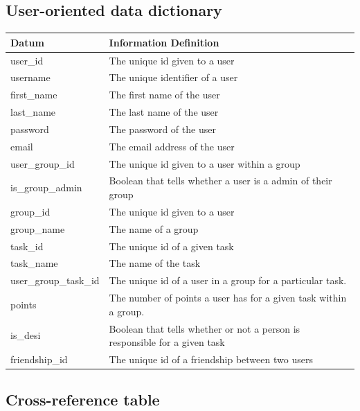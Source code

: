 \documentclass[a4paper]{article}
\begin{document}
\subsection{User-oriented data dictionary}
\begin{table}[H]
\centering
\begin{tabular}{| l | l |}
Datum & Information Definition \\\hline

user\_id & The unique id given to a user\\
username & The unique identifier of a user\\
first\_name & The first name of the user\\
last\_name & The last name of the user\\
password & The password of the user\\
email & The email address of the user\\

user\_group\_id & The unique id given to a user within a group\\
is\_group\_admin & Boolean that tells whether a user is a admin of their group\\

group\_id & The unique id given to a user\\
group\_name & The name of a group\\

task\_id & The unique id of a given task\\
task\_name & The name of the task\\

user\_group\_task\_id & The unique id of a user in a group for a particular task.\\
points & The number of points a user has for a given task within a group.\\
is\_desi & Boolean that tells whether or not a person is responsible for a given task\\


friendship\_id & The unique id of a friendship between two users\\


\end{tabular}
\end{table}

\subsection*{Cross-reference table}
\end{document}
